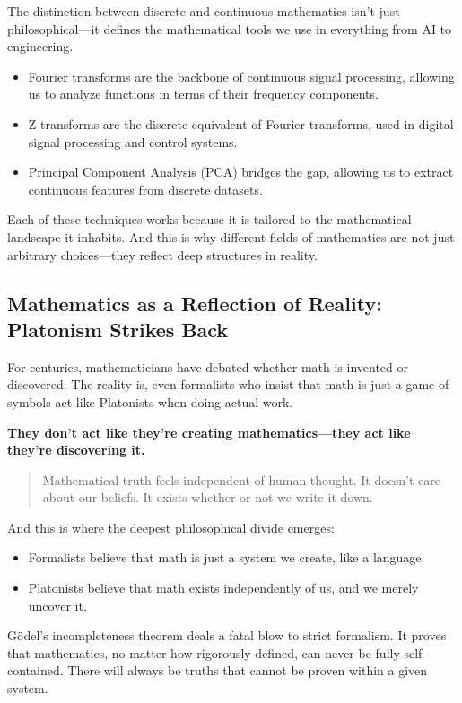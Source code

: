 The distinction between discrete and continuous mathematics isn’t just philosophical—it defines the mathematical tools we use in everything from AI to engineering.

\begin{itemize}
    \item Fourier transforms are the backbone of continuous signal processing, allowing us to analyze functions in terms of their frequency components.
    \item Z-transforms are the discrete equivalent of Fourier transforms, used in digital signal processing and control systems.
    \item Principal Component Analysis (PCA) bridges the gap, allowing us to extract continuous features from discrete datasets.
\end{itemize}

Each of these techniques works because it is tailored to the mathematical landscape it inhabits. And this is why different fields of mathematics are not just arbitrary choices—they reflect deep structures in reality.

\subsection{Mathematics as a Reflection of Reality: Platonism Strikes Back}

For centuries, mathematicians have debated whether math is invented or discovered. The reality is, even formalists who insist that math is just a game of symbols act like Platonists when doing actual work.

\textbf{They don’t act like they’re creating mathematics—they act like they’re discovering it.}

\begin{quote}
Mathematical truth feels independent of human thought. It doesn’t care about our beliefs. It exists whether or not we write it down.
\end{quote}

And this is where the deepest philosophical divide emerges:

\begin{itemize}
    \item Formalists believe that math is just a system we create, like a language.
    \item Platonists believe that math exists independently of us, and we merely uncover it.
\end{itemize}

Gödel’s incompleteness theorem deals a fatal blow to strict formalism. It proves that mathematics, no matter how rigorously defined, can never be fully self-contained. There will always be truths that cannot be proven within a given system.

